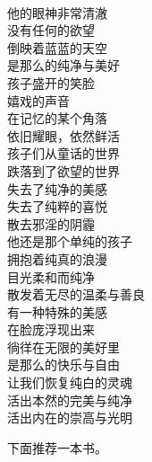 \begin{poem}[纯白的灵魂]
    \begin{multicols}{3}
        \centering~\\
        他的眼神非常清澈 \\ 没有任何的欲望 \\ 倒映着蓝蓝的天空 \\ 是那么的纯净与美好 \\ 孩子盛开的笑脸 \\ 嬉戏的声音 \\ 在记忆的某个角落 \\ 依旧耀眼，依然鲜活 \\ 孩子们从童话的世界 \\ 跌落到了欲望的世界 \\ 失去了纯净的美感 \\ 失去了纯粹的喜悦 \\ 散去邪淫的阴霾 \\ 他还是那个单纯的孩子 \\ 拥抱着纯真的浪漫 \\ 目光柔和而纯净 \\ 散发着无尽的温柔与善良 \\ 有一种特殊的美感 \\ 在脸庞浮现出来 \\ 徜徉在无限的美好里 \\ 是那么的快乐与自由 \\ 让我们恢复纯白的灵魂 \\ 活出本然的完美与纯净 \\ 活出内在的崇高与光明
    \end{multicols}
\end{poem}

下面推荐一本书。

